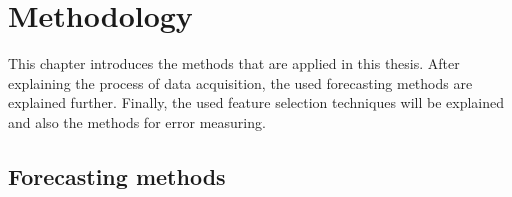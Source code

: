 \chapter{Methodology}
\label{ch:methods}

This chapter introduces the methods that are applied in this thesis. After explaining the process of data acquisition, the used forecasting methods are explained further. Finally, the used feature selection techniques will be explained and also the methods for error measuring.\\


%
%

\section{Forecasting methods}
\label{sec:forecastmet}

